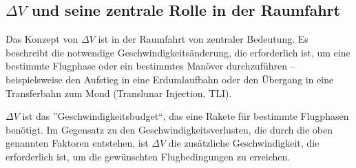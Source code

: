 %
%

\subsection{\(\Delta V\) und seine zentrale Rolle in der Raumfahrt}
Das Konzept von \(\Delta V\) ist in der Raumfahrt von zentraler Bedeutung. 
Es beschreibt die notwendige Geschwindigkeitsänderung, die erforderlich ist, um eine bestimmte Flugphase oder ein bestimmtes Manöver durchzuführen – beispielsweise den Aufstieg in eine Erdumlaufbahn oder den Übergang in eine Transferbahn zum Mond (Translunar Injection, TLI).

\(\Delta V\) ist das ''Geschwindigkeitsbudget``, das eine Rakete für bestimmte Flugphasen benötigt. 
Im Gegensatz zu den Geschwindigkeitsverlusten, die durch die oben genannten Faktoren entstehen, ist \(\Delta V\) die zusätzliche Geschwindigkeit, die erforderlich ist, um die gewünschten Flugbedingungen zu erreichen.

